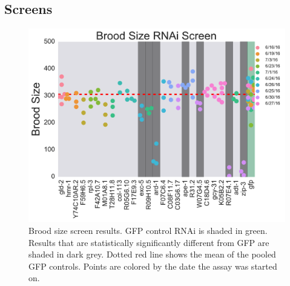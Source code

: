\documentclass[10pt,letterpaper,twocolumn]{article}
\begin{document}
\subsection*{Screens}
\label{subs:Screens}

\begin{figure}
\renewcommand{\familydefault}{\sfdefault}\normalfont{}
\centering
\includegraphics[width=\linewidth]{../output/figs/final_figs/rnai_brood_assay_results.pdf}
\caption{Brood size screen results. GFP control RNAi is shaded in green. Results that are statistically significantly different from GFP are shaded in dark grey. Dotted red line shows the mean of the pooled GFP controls. Points are colored by the date the assay was started on.
}%
\label{fig:broodassay}
\end{figure}
\end{document}
